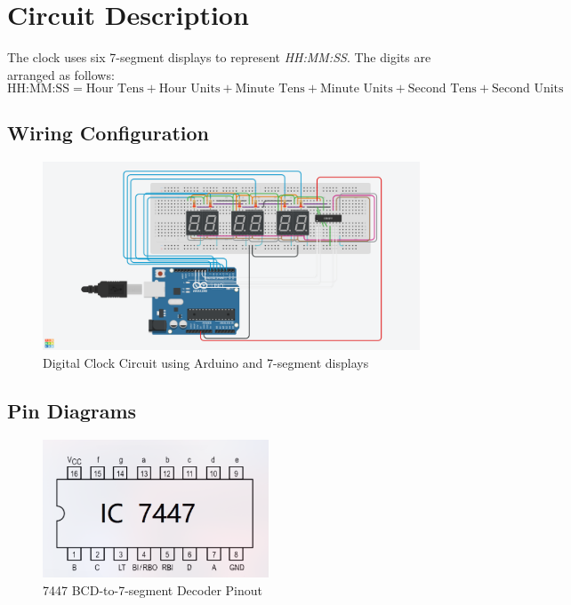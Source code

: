 \documentclass{article}
\begin{document}
\section{Circuit Description}
The clock uses six 7-segment displays to represent \textit{HH:MM:SS}. The digits are arranged as follows:
\[
\text{{HH:MM:SS}} = \text{{Hour Tens}} + \text{{Hour Units}} + \text{{Minute Tens}} + \text{{Minute Units}} + \text{{Second Tens}} + \text{{Second Units}}
\]

\subsection{Wiring Configuration}
\begin{figure}[H]
    \centering
    \includegraphics[width=\textwidth]{figs/Clock.jpg}
    \caption{Digital Clock Circuit using Arduino and 7-segment displays}
\end{figure}

\subsection{Pin Diagrams}

\begin{figure}[H]
    \centering
    \includegraphics[width=0.6\textwidth]{figs/7447_pinout.jpg}
    \caption{7447 BCD-to-7-segment Decoder Pinout}
\end{figure}
\end{document}
